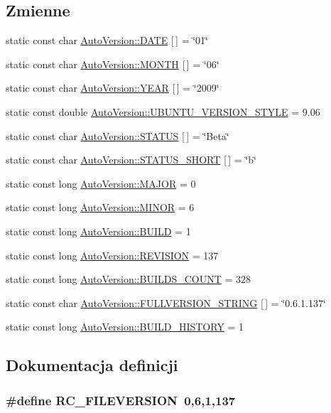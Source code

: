 \subsection*{Zmienne}
\begin{CompactItemize}
\item 
static const char \hyperlink{a00019_76114a4076f4ae162ea5de4f97d1a597}{AutoVersion::DATE} \mbox{[}$\,$\mbox{]} = \char`\"{}01\char`\"{}
\item 
static const char \hyperlink{a00019_c5504cfe250e5b6e09bde81a917c4349}{AutoVersion::MONTH} \mbox{[}$\,$\mbox{]} = \char`\"{}06\char`\"{}
\item 
static const char \hyperlink{a00019_c6726fe1f27cfa5f70c5eb624c6095fc}{AutoVersion::YEAR} \mbox{[}$\,$\mbox{]} = \char`\"{}2009\char`\"{}
\item 
static const double \hyperlink{a00019_06157f622b974a3180a91ffa5e4fc200}{AutoVersion::UBUNTU\_\-VERSION\_\-STYLE} = 9.06
\item 
static const char \hyperlink{a00019_cb58e6df1058868fe3e780122ab30ef1}{AutoVersion::STATUS} \mbox{[}$\,$\mbox{]} = \char`\"{}Beta\char`\"{}
\item 
static const char \hyperlink{a00019_dc0aeb82b23e4fa3a91bc1f4d2ab0aed}{AutoVersion::STATUS\_\-SHORT} \mbox{[}$\,$\mbox{]} = \char`\"{}b\char`\"{}
\item 
static const long \hyperlink{a00019_85ad69390168fa80a3868ae22631b48c}{AutoVersion::MAJOR} = 0
\item 
static const long \hyperlink{a00019_2c324b304c1d4c4d273f848c50679eb4}{AutoVersion::MINOR} = 6
\item 
static const long \hyperlink{a00019_611dbb96b2f949b29627d8d714396911}{AutoVersion::BUILD} = 1
\item 
static const long \hyperlink{a00019_e2d1fcdc67a4319c421677ebe1ef4d09}{AutoVersion::REVISION} = 137
\item 
static const long \hyperlink{a00019_03e819549a8f22b45aacef6ac27de284}{AutoVersion::BUILDS\_\-COUNT} = 328
\item 
static const char \hyperlink{a00019_2c666a4ee8f49f7647b06e6c526858ad}{AutoVersion::FULLVERSION\_\-STRING} \mbox{[}$\,$\mbox{]} = \char`\"{}0.6.1.137\char`\"{}
\item 
static const long \hyperlink{a00019_cc483b25abe55f62bcf02496baf549dc}{AutoVersion::BUILD\_\-HISTORY} = 1
\end{CompactItemize}


\subsection{Dokumentacja definicji}
\hypertarget{a00017_0e86d046ea87587e402d375c6b0927c6}{
\subsubsection[{RC\_\-FILEVERSION}]{\setlength{\rightskip}{0pt plus 5cm}\#define RC\_\-FILEVERSION~0,6,1,137}}
\label{d4/d51/a00017_0e86d046ea87587e402d375c6b0927c6}




